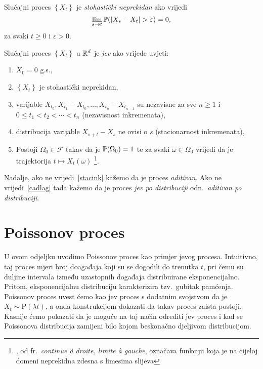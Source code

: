 \documentclass[main.tex]{subfiles}
\begin{document}
\begin{definicija}
	Slučajni proces \( \left\{ X_t \right\} \) je \emph{stohastički neprekidan} ako vrijedi
	\begin{equation} \label{def:stohnep}
		\lim\limits_{s \rightarrow t} \P (\abs{X_s - X_t} > \varepsilon)  = 0,
	\end{equation}
	za svaki \( t \ge 0 \) i \( \varepsilon > 0 \).
\end{definicija}

\begin{definicija}
	Slučajni proces \( \left\{ X_t \right\} \) u \( \R^d \) je \emph{\levy jev} ako vrijede uvjeti:
	\begin{enumerate}[label=(\roman*)]
		\item \( X_0 = 0 \) g.s.,
		\item \( \left\{ X_t \right\} \) je stohastički neprekidan,
		\item varijable \( X_{t_0}, X_{t_1}-X_{t_0}, \ldots ,X_{t_n}-X_{t_{n-1}} \) su nezavisne za sve \( n \ge 1 \) i \(0 \le t_1 < t_2 < \cdots < t_n \) (nezavisnost inkremenata),
		\item distribucija varijable \( X_{s+t}-X_s \) ne ovisi o \( s \) (stacionarnost inkremenata), \label{stacink}
		\item Postoji \( \Omega_0 \in \mathcal F \) takav da je \( \P(\Omega_0) = 1 \) te za svaki \( \omega \in \Omega_0 \) vrijedi da je trajektorija
		      \( t \mapsto X_t(\omega) \) \cadlag\footnote{\cadlag, od fr.\ \textit{continue à droite, limite à gauche}, označava funkciju koja je na cijeloj domeni neprekidna zdesna s limesima slijeva}. \label{cadlag}
	\end{enumerate}
	Nadalje, ako ne vrijedi~\ref{stacink} kažemo da je proces \emph{aditivan}. Ako ne vrijedi~\ref{cadlag} tada kažemo da je proces \emph{\levy jev po distribuciji} odn.\
	\emph{aditivan po distribuciji}.
\end{definicija}

\section{Poissonov proces}\label{sec:sp-poisson}
U ovom odjeljku uvodimo Poissonov proces kao primjer \levy jevog procesa. Intuitivno, taj proces mjeri broj doagađaja koji su se dogodili do
trenutka \( t \), pri čemu su duljine intervala između uzastopnih događaja distribuirane eksponencijalno. Pritom, eksponencijalnu distribuciju karakterizira
tzv.\ gubitak pamćenja. Poissonov proces uvest ćemo kao \levy jev proces s dodatnim svojstvom da je \( X_t \sim \mathrm P(\lambda t) \), a onda konstrukcijom
dokazati da takav proces zaista postoji. Kasnije ćemo pokazati da je moguće na taj način odrediti \levy jev proces i kad se Poissonova distribucija zamijeni
bilo kojom beskonačno djeljivom distribucijom.
\end{document}
